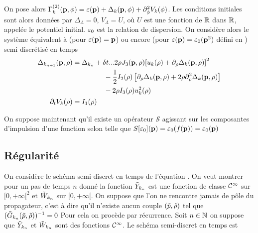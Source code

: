\documentclass[10pt]{article}
\begin{document}
On pose alors $\Gamma_{k}^{(2)}({\bf p}, \phi) = \varepsilon({\bf p}) + \Delta_k({\bf p}, \phi) + \partial_\phi^2 V_k(\phi)$. Les conditions initiales sont alors données par $\Delta_\Lambda = 0$, $V_\Lambda = U$, où $U$ est une fonction de $\mathbb{R}$ dans $\mathbb{R}$, appelée le potentiel initial. $\varepsilon_0$ est la relation de dispersion. On considère alors le système équivalent à  (pour $\varepsilon({\bf p}) = {\bf p}$) ou encore  (pour $\varepsilon({\bf p}) = \varepsilon_0({\bf p}^2)$ défini en ) semi discrétisé en temps
\begin{align}
	\Delta_{k_{n+1}}({\bf p}, \rho) & = \Delta_{k_{n}} + 
	\begin{aligned}[t]
	 & \delta t ... 2\rho J_3({\bf p},\rho){\left[u_k(\rho) + \partial_\rho \Delta_k ({\bf p},\rho) \right]}^{2} \\
	  & \, - \frac{1}{2}I_2(\rho) \left[\partial_\rho \Delta_k({\bf p}, \rho) +  2\rho \partial_\rho^2 \Delta_k({\bf p},\rho) \right] \\
	 & \, - 2\rho I_3 (\rho) u_k^2(\rho) 
	 \end{aligned}
	\label{eqn:sys1}\\
	\partial_t V_k(\rho) & = 
	\begin{aligned}[t]
		& I_1(\rho)
	\end{aligned}
\end{align}



On suppose maintenant qu'il existe un opérateur $\mathcal{S}$ agissant sur les composantes d'impulsion d'une fonction selon telle que $S[\varepsilon_0]({\bf p}) = \varepsilon_0(f({\bf p})) = \varepsilon_0({\bf p})$  

\subsection{Régularité}

On considère le schéma semi-discret en temps de l'équation .  On veut montrer pour un pas de temps $n$ donné la fonction $\tilde{Y}_{k_n}$ est une fonction de classe $\mathcal{C}^\infty$ sur $[0, +\infty[^2$ et $\tilde{W}_{k_n}$ sur $[0, +\infty[$.
On suppose que l'on ne rencontre jamais de pôle du propagateur, c'est à dire qu'il n'existe aucun couple $(\tilde{p},\tilde{\rho})$ tel que $(\tilde{G}_{k_n}(\tilde{p}, \tilde{\rho}))^{-1} = 0$ 
Pour cela on procède par récurrence. Soit $n \in \mathbb{N}$ on suppose que $\tilde{Y}_{k_n}$ et $\tilde{W}_{k_n}$ sont des fonctions $\mathcal{C}^\infty$. Le schéma semi-discret en temps est 
\end{document}

